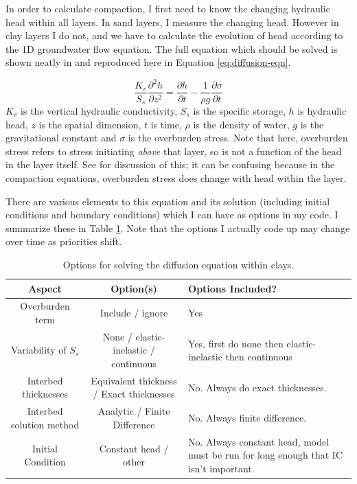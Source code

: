 \documentclass{article}
\begin{document}
In order to calculate compaction, I first need to know the changing hydraulic head within all layers. In sand layers, I measure the changing head. However in clay layers I do not, and we have to calculate the evolution of head according to the 1D groundwater flow equation. The full equation which should be solved is shown neatly in \cite{helm_one-dimensional_1975} and reproduced here in Equation \ref{eq:diffusion-eqn}.

\begin{equation}
\frac{K_v}{S_s} \frac{\partial^2h}{\partial z^2} = \frac{\partial h}{\partial t} - \frac{1}{\rho g} \frac{\partial \sigma}{\partial t}
\label{eq:diffusion-eqn}
\end{equation}
$K_v$ is the vertical hydraulic conductivity, $S_s$ is the specific storage, $ h$ is hydraulic head, $z$ is the spatial dimension, $ t$ is time, $ \rho$ is the density of water, $ g $ is the gravitational constant and $\sigma$ is the overburden stress. Note that here, overburden stress refers to stress initiating \textit{above} that layer, so is not a function of the head in the layer itself. See \cite{helm_one-dimensional_1975} for discussion of this; it can be confusing because in the compaction equations, overburden stress does change with head within the layer.

There are various elements to this equation and its solution (including initial conditions and boundary conditions) which I can have as options in my code. I summarize these in Table \ref{table:diffn-options}. Note that the options I actually code up may change over time as priorities shift.

\begin{table}[h]
\centering
\begin{tabular}{|c|c|p{4cm}|} 
\hline
\textbf{Aspect} & \textbf{Option(s)} & \textbf{Options Included?} \\ 
\hline
Overburden term & Include / ignore & Yes\\
Variability of $S_s$ & None / elastic-inelastic / continuous & Yes, first do none then elastic-inelastic then continuous \\
Interbed thicknesses & Equivalent thickness / Exact thicknesses  & No. Always do exact thicknesses.\\
Interbed solution method & Analytic / Finite Difference & No. Always finite difference.  \\
Initial Condition & Constant head / other & No. Always constant head, model must be run for long enough that IC isn't important. \\ 
\hline 
\end{tabular}
\caption{Options for solving the diffusion equation within clays.}
\label{table:diffn-options}
\end{table}
\end{document}
